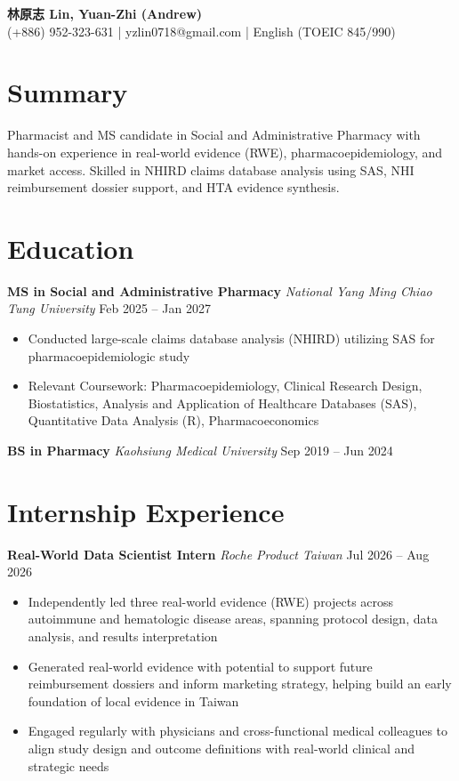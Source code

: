 \documentclass[10pt,a4paper]{article}
\newcommand{\entry}[3]{%
    \noindent\textbf{#1} \textbar{} \textit{#3} \hfill #2%
}
\begin{document}
\begin{center}
    {\LARGE\bfseries 林原志 Lin, Yuan-Zhi (Andrew)} \\[0.3em]
    (+886) 952-323-631 \quad | \quad yzlin0718@gmail.com \quad | \quad English (TOEIC 845/990)
\end{center}

\section{Summary}

Pharmacist and MS candidate in Social and Administrative Pharmacy with hands-on experience in real-world evidence (RWE), pharmacoepidemiology, and market access. Skilled in NHIRD claims database analysis using SAS, NHI reimbursement dossier support, and HTA evidence synthesis.

\section{Education}

\entry{MS in Social and Administrative Pharmacy}{Feb 2025 -- Jan 2027}{National Yang Ming Chiao Tung University}
\begin{itemize}
    \item Conducted large-scale claims database analysis (NHIRD) utilizing SAS for pharmacoepidemiologic study
    \item Relevant Coursework: Pharmacoepidemiology, Clinical Research Design, Biostatistics, Analysis and Application of Healthcare Databases (SAS), Quantitative Data Analysis (R), Pharmacoeconomics
\end{itemize}

\vspace{0.4em}

\entry{BS in Pharmacy}{Sep 2019 -- Jun 2024}{Kaohsiung Medical University}

\section{Internship Experience}

\entry{Real-World Data Scientist Intern}{Jul 2026 -- Aug 2026}{Roche Product Taiwan}
\begin{itemize}
    \item Independently led three real-world evidence (RWE) projects across autoimmune and hematologic disease areas, spanning protocol design, data analysis, and results interpretation
    \item Generated real-world evidence with potential to support future reimbursement dossiers and inform marketing strategy, helping build an early foundation of local evidence in Taiwan
    \item Engaged regularly with physicians and cross-functional medical colleagues to align study design and outcome definitions with real-world clinical and strategic needs
\end{itemize}
\end{document}
